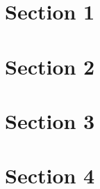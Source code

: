 \section{Section 1}
  \lipsum[2-4]

\section{Section 2}
  \lipsum[2-4]

\section{Section 3}
  \lipsum[2-4]

\section{Section 4}
  \lipsum[2-4]
